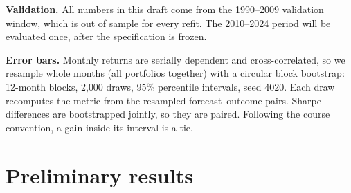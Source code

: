 \documentclass{article}
\begin{document}
\textbf{Validation.} All numbers in this draft come from the 1990--2009 validation window, which is out of sample for every refit. The 2010--2024 period will be evaluated once, after the specification is frozen.

\textbf{Error bars.} Monthly returns are serially dependent and cross-correlated, so we resample whole months (all portfolios together) with a circular block bootstrap: 12-month blocks, 2{,}000 draws, 95\% percentile intervals, seed 4020. Each draw recomputes the metric from the resampled forecast--outcome pairs. Sharpe differences are bootstrapped jointly, so they are paired. Following the course convention, a gain inside its interval is a tie.

\section{Preliminary results}
\end{document}
